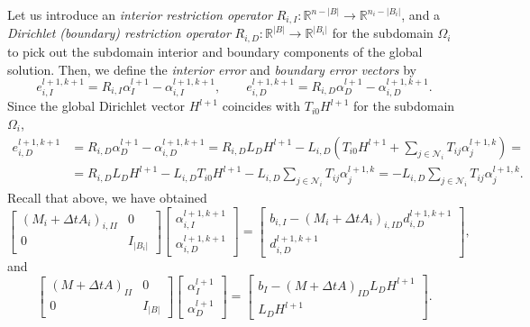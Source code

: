 \documentclass[a4paper, 11pt]{article}
\theoremstyle{plain}
\theoremstyle{definition}
\theoremstyle{remark}
\begin{document}
Let us introduce an \textit{interior restriction operator} $R_{i, I}: \mathbb{R}^{n - \lvert B\rvert} \to \mathbb{R}^{n_{i} - \lvert B_{i}\rvert}$, and a \textit{Dirichlet (boundary) restriction operator} $R_{i, D}: \mathbb{R}^{\lvert B\rvert} \to \mathbb{R}^{\lvert B_{i}\rvert}$ for the subdomain $\Omega_{i}$ to pick out the subdomain interior and boundary components of the global solution. Then, we define the \textit{interior error} and \textit{boundary error vectors} by
\begin{equation*}
    e_{i, I}^{l+1, k+1} = R_{i, I}\alpha_{I}^{l+1} - \alpha_{i, I}^{l+1, k+1}, \qquad e_{i, D}^{l+1, k+1} = R_{i, D}\alpha_{D}^{l+1} - \alpha_{i, D}^{l+1, k+1}.
\end{equation*}
Since the global Dirichlet vector $H^{l+1}$ coincides with $T_{i0}H^{l+1}$ for the subdomain $\Omega_{i}$,
\begin{align*}
    e_{i, D}^{l+1, k+1} &= R_{i, D}\alpha_{D}^{l+1} - \alpha_{i, D}^{l+1, k+1} = R_{i, D}L_{D}H^{l+1} - L_{i, D}\left(T_{i0}H^{l+1} + \sum_{j\in\mathcal{N}_{i}}T_{ij}\alpha^{l+1, k}_{j}\right) = \\
    &= R_{i, D}L_{D}H^{l+1} - L_{i, D}T_{i0}H^{l+1} - L_{i, D}\sum_{j\in\mathcal{N}_{i}}T_{ij}\alpha^{l+1, k}_{j} =    
    -L_{i, D}\sum_{j\in\mathcal{N}_{i}}T_{ij}\alpha^{l+1, k}_{j}.
\end{align*}
Recall that above, we have obtained
\begin{equation*}
    \begin{bmatrix}
        \left(M_{i} + \Delta t A_{i}\right)_{i, II} & 0\\
        0 & I_{\lvert B_{i}\rvert}
    \end{bmatrix}
    \begin{bmatrix}
        \alpha_{i, I}^{l+1, k+1}\\
        \alpha_{i, D}^{l+1, k+1}
    \end{bmatrix} =
    \begin{bmatrix}
        b_{i, I} - \left(M_{i} + \Delta t A_{i}\right)_{i, ID}d^{l+1, k+1}_{i, D}\\
        d^{l+1, k+1}_{i, D}
    \end{bmatrix},
\end{equation*}
and
\begin{equation*}
    \begin{bmatrix}
        \left(M + \Delta t A\right)_{II} & 0\\
        0 & I_{\lvert B\rvert}
    \end{bmatrix}
    \begin{bmatrix}
        \alpha_{I}^{l+1}\\[1pt]
        \alpha_{D}^{l+1}
    \end{bmatrix} = 
    \begin{bmatrix}
        b_{I} - \left(M + \Delta t A\right)_{ID}L_{D}H^{l+1}\\
        L_{D}H^{l+1}
    \end{bmatrix}.
\end{equation*}
\end{document}
